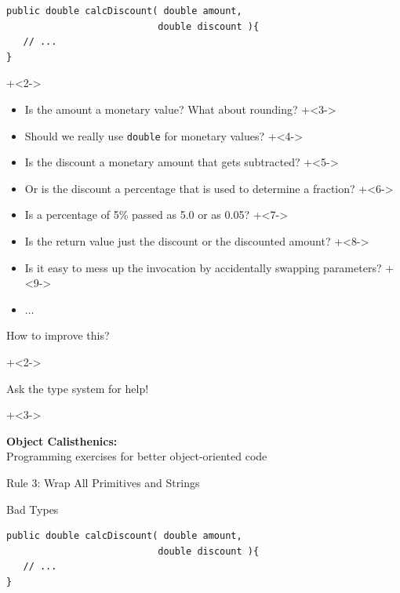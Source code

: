 \begin{frame}[fragile]{}

\begin{lstlisting}
public double calcDiscount( double amount, 
                           double discount ){
   // ...
}
\end{lstlisting}

\onslide+<2->

\begin{itemize}
\item Is the amount a monetary value? What about rounding?
\onslide+<3->
\item Should we really use \texttt{double} for monetary values?
\onslide+<4->
\item Is the discount a monetary amount that gets subtracted?
\onslide+<5->
\item Or is the discount a percentage that is used to determine a fraction?
\onslide+<6->
\item Is a percentage of 5\% passed as 5.0 or as 0.05?
\onslide+<7->
\item Is the return value just the discount or the discounted amount?
\onslide+<8->
\item Is it easy to mess up the invocation by accidentally swapping parameters?
\onslide+<9->
\item $\ldots$
\end{itemize}

\end{frame}


\begin{frame}[fragile]{How to improve this?}

\onslide+<2->

{
\huge
Ask the type system for help!
}

\onslide+<3->

\vspace{4em}
\textbf{Object Calisthenics:} \\Programming exercises for better object-oriented code

\vspace{2em}
Rule 3: Wrap All Primitives and Strings

\end{frame}

\begin{frame}[fragile]{Bad Types}

\begin{lstlisting}
public double calcDiscount( double amount, 
                           double discount ){
   // ...
}
\end{lstlisting}

\end{frame}

